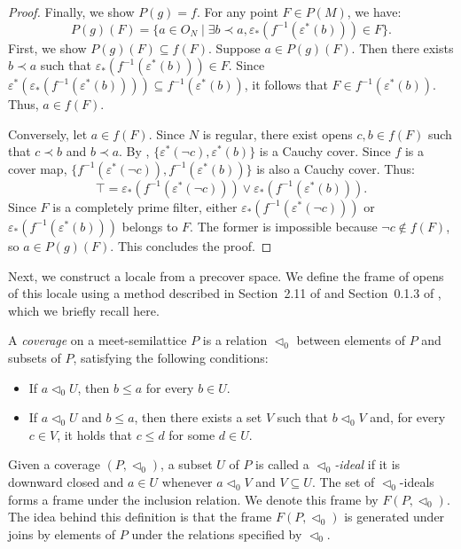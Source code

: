 \documentclass[reqno]{amsart}
\theoremstyle{definition}
\theoremstyle{remark}
\numberwithin{figure}{section}
\newcommand{\rb}{\prec}
\begin{document}
\begin{proof}
Finally, we show $P(g) = f$.  
For any point $F \in P(M)$, we have:
\[
P(g)(F) = \{ a \in O_N \mid \exists b \rb a, \varepsilon_*(f^{-1}(\varepsilon^*(b))) \in F \}.
\]
First, we show $P(g)(F) \subseteq f(F)$.  
Suppose $a \in P(g)(F)$.
Then there exists $b \rb a$ such that $\varepsilon_*(f^{-1}(\varepsilon^*(b))) \in F$.
Since $\varepsilon^*(\varepsilon_*(f^{-1}(\varepsilon^*(b)))) \subseteq f^{-1}(\varepsilon^*(b))$, it follows that $F \in f^{-1}(\varepsilon^*(b))$.
Thus, $a \in f(F)$.  

Conversely, let $a \in f(F)$.  
Since $N$ is regular, there exist opens $c,b \in f(F)$ such that $c \rb b$ and $b \rb a$.
By , $\{ \varepsilon^*(\neg c), \varepsilon^*(b) \}$ is a Cauchy cover.
Since $f$ is a cover map, $\{ f^{-1}(\varepsilon^*(\neg c)), f^{-1}(\varepsilon^*(b)) \}$ is also a Cauchy cover.
Thus:
\[
\top = \varepsilon_*(f^{-1}(\varepsilon^*(\neg c))) \vee \varepsilon_*(f^{-1}(\varepsilon^*(b))).
\]
Since $F$ is a completely prime filter, either $\varepsilon_*(f^{-1}(\varepsilon^*(\neg c)))$ or $\varepsilon_*(f^{-1}(\varepsilon^*(b)))$ belongs to $F$.
The former is impossible because $\neg c \notin f(F)$, so $a \in P(g)(F)$.  
This concludes the proof.
\end{proof}

Next, we construct a locale from a precover space.  
We define the frame of opens of this locale using a method described in Section~2.11 of \cite{stone-spaces} and Section~0.1.3 of \cite{vickers-compact}, which we briefly recall here.

A \emph{coverage} on a meet-semilattice $P$ is a relation $\triangleleft_0$ between elements of $P$ and subsets of $P$, satisfying the following conditions:
\begin{itemize}
\item If $a \triangleleft_0 U$, then $b \leq a$ for every $b \in U$.
\item If $a \triangleleft_0 U$ and $b \leq a$, then there exists a set $V$ such that $b \triangleleft_0 V$ and, for every $c \in V$, it holds that $c \leq d$ for some $d \in U$.
\end{itemize}

Given a coverage $(P,\triangleleft_0)$, a subset $U$ of $P$ is called a \emph{$\triangleleft_0$-ideal} if it is downward closed and $a \in U$ whenever $a \triangleleft_0 V$ and $V \subseteq U$.
The set of $\triangleleft_0$-ideals forms a frame under the inclusion relation.
We denote this frame by $F(P,\triangleleft_0)$.
The idea behind this definition is that the frame $F(P, \triangleleft_0)$ is generated under joins by elements of $P$ under the relations specified by $\triangleleft_0$.
\end{document}
